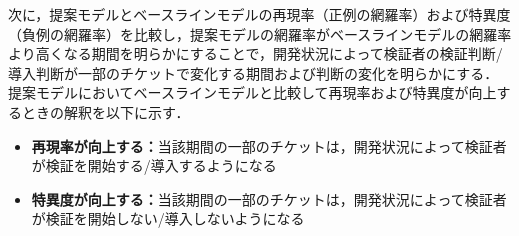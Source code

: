 \documentclass[11pt]{jreport}
\begin{document}

次に，提案モデルとベースラインモデルの再現率（正例の網羅率）および特異度（負例の網羅率）を比較し，提案モデルの網羅率がベースラインモデルの網羅率より高くなる期間を明らかにすることで，開発状況によって検証者の検証判断/導入判断が一部のチケットで変化する期間および判断の変化を明らかにする．提案モデルにおいてベースラインモデルと比較して再現率および特異度が向上するときの解釈を以下に示す．

\begin{itemize}
  \item \textbf{再現率が向上する：}当該期間の一部のチケットは，開発状況によって検証者が検証を開始する/導入するようになる
  \item \textbf{特異度が向上する：}当該期間の一部のチケットは，開発状況によって検証者が検証を開始しない/導入しないようになる
\end{itemize}

\end{document}
